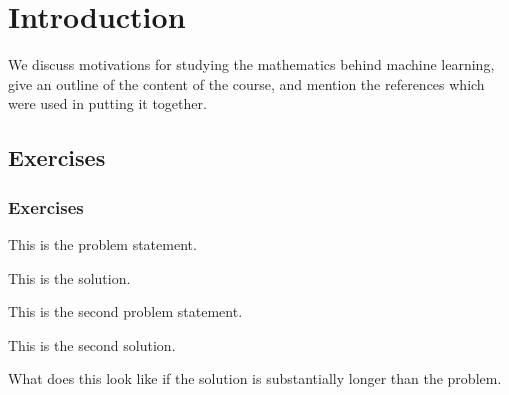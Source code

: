 \chapter{Introduction}

\begin{chout}
	We discuss motivations for studying the mathematics behind machine learning, give an outline of the content of the course, and mention the references which were used in putting it together.
\end{chout}

\section{Exercises}
\subsection{Exercises \basic}
\begin{exercise}
	\begin{problem}
	This is the problem statement.
	\end{problem}
	\begin{solution}
		This is the solution.
	\end{solution}
\end{exercise}

\begin{exercise}
	\begin{problem}
	This is the second problem statement.
	\end{problem}
	\begin{solution}
		This is the second solution.

		What does this look like if the solution is substantially longer than the problem.
	\end{solution}
\end{exercise}

